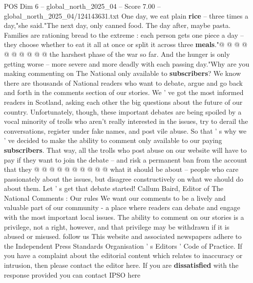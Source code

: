 \begin{textsample}{POS Dim 6 – global\_north\_2025\_04 – Score 7.00 – global\_north\_2025\_04/124143631.txt}
One day, we eat plain \textbf{rice} -- three times a day,"she said."The next day, only canned food.
The day after, maybe pasta.
Families are rationing bread to the extreme : each person gets one piece a day -- they choose whether to eat it all at once or split it across three \textbf{meals}."@ @ @ @ @ @ @ @ @ @ the harshest phase of the war so far.
And the hunger is only getting worse -- more severe and more deadly with each passing day."Why are you making commenting on The National only available to \textbf{subscribers}?
We know there are thousands of National readers who want to debate, argue and go back and forth in the comments section of our stories.
We ' ve got the most informed readers in Scotland, asking each other the big questions about the future of our country.
Unfortunately, though, these important debates are being spoiled by a vocal minority of trolls who aren't really interested in the issues, try to derail the conversations, register under fake names, and post vile abuse.
So that ' s why we ' ve decided to make the ability to comment only available to our paying \textbf{subscribers}.
That way, all the trolls who post abuse on our website will have to pay if they want to join the debate -- and risk a permanent ban from the account that they @ @ @ @ @ @ @ @ @ @ what it should be about -- people who care passionately about the issues, but disagree constructively on what we should do about them.
Let ' s get that debate started!
Callum Baird, Editor of The National Comments : Our rules We want our comments to be a lively and valuable part of our community - a place where readers can debate and engage with the most important local issues.
The ability to comment on our stories is a privilege, not a right, however, and that privilege may be withdrawn if it is abused or misused. follow us This website and associated newspapers adhere to the Independent Press Standards Organisation ' s Editors ' Code of Practice.
If you have a complaint about the editorial content which relates to inaccuracy or intrusion, then please contact the editor here.
If you are \textbf{dissatisfied} with the response provided you can contact IPSO here

\end{textsample}
